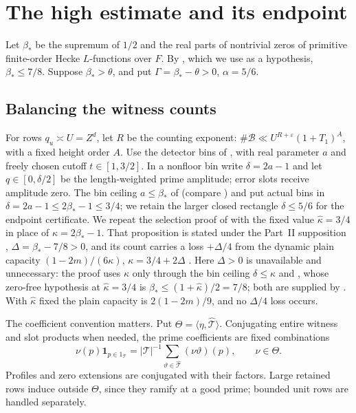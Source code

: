 \section{The high estimate and its endpoint}\label{gex:high-section}

Let \(\beta_*\) be the supremum of \(1/2\) and the real parts of
nontrivial zeros of primitive finite-order Hecke \(L\)-functions over
\(F\). By \cite[Theorem~1.1]{OAI26}, which we use as a hypothesis,
\(\beta_*\le7/8\).
Suppose \(\beta_*>\theta\), and put
\(\Gamma=\beta_*-\theta>0\), \(\alpha=5/6\).

\subsection{Balancing the witness counts}

For rows \(q_u\asymp U=Z^d\), let \(R\) be the counting exponent:
\(\#\mathcal B\ll U^{R+\varepsilon}(1+T_1)^A\), with a fixed
height order \(A\). Use the detector bins of \cite[Section 8]{OAI26},
with real parameter \(a\) and freely chosen cutoff \(t\in[1,3/2]\).
In a nonfloor bin write \(\delta=2a-1\) and let
\(q\in[0,\delta/2]\) be the length-weighted prime amplitude; error
slots receive amplitude zero. The bin ceiling \(a\le\beta_*\) of
\cite[Section 8]{OAI26} (compare \cite[(12.2)]{OAI26}) and
\cite[Theorem~1.1]{OAI26} put actual bins in
\(\delta=2a-1\le2\beta_*-1\le3/4\); we retain the larger closed
rectangle \(\delta\le5/6\) for the endpoint certificate.
We repeat the selection proof of \cite[Proposition 19.2]{OAI26} with
the fixed value \(\widehat\kappa=3/4\) in place of \(\kappa=2\beta_*-1\).
That proposition is stated under the Part~II supposition
\cite[(12.1)]{OAI26}, \(\Delta=\beta_*-7/8>0\), and its count carries a
loss \(+\Delta/4\) from the dynamic plain capacity
\((1-2m)/(6\kappa)\), \(\kappa=3/4+2\Delta\) \cite[(19.2)]{OAI26}.
Here \(\Delta>0\) is unavailable and unnecessary: the proof uses
\(\kappa\) only through the bin ceiling \(\delta\le\kappa\) and
\cite[Lemma 18.1]{OAI26}, whose zero-free hypothesis at
\(\widehat\kappa=3/4\) is \(\beta_*\le(1+\widehat\kappa)/2=7/8\); both
are supplied by \cite[Theorem~1.1]{OAI26}. With \(\widehat\kappa\) fixed the plain
capacity is \(2(1-2m)/9\), and no \(\Delta/4\) loss occurs.

The coefficient convention matters. Put
\(\Theta=\langle\eta,\widehat{\mathcal T}\rangle\).
Conjugating entire witness and slot products when needed, the
prime coefficients are fixed combinations
\[
 \nu(p)\mathbf1_{p\in1_{\mathcal T}}
  =|\mathcal T|^{-1}
    \sum_{\vartheta\in\widehat{\mathcal T}}(\nu\vartheta)(p),
 \qquad \nu\in\Theta .
\]
Profiles and zero extensions are conjugated with their factors.
Large retained rows induce outside \(\Theta\), since they ramify
at a good prime; bounded unit rows are handled separately.

